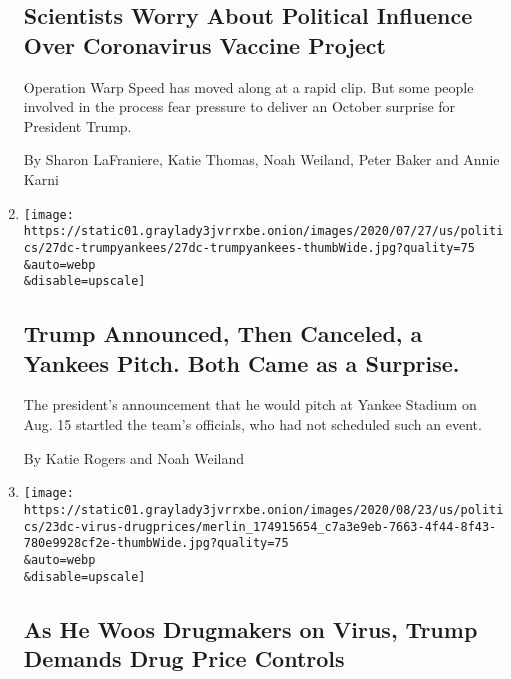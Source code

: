 \begin{enumerate}
  \hypertarget{scientists-worry-about-political-influence-over-coronavirus-vaccine-project}{%
  \subsection{Scientists Worry About Political Influence Over
  Coronavirus Vaccine
  Project}\label{scientists-worry-about-political-influence-over-coronavirus-vaccine-project}}

  Operation Warp Speed has moved along at a rapid clip. But some people
  involved in the process fear pressure to deliver an October surprise
  for President Trump.

  By Sharon LaFraniere, Katie Thomas, Noah Weiland, Peter Baker and
  Annie Karni
\item
  \href{/2020/07/27/us/politics/trump-yankees-fauci.html}{}

  \texttt{[image: https://static01.graylady3jvrrxbe.onion/images/2020/07/27/us/politics/27dc-trumpyankees/27dc-trumpyankees-thumbWide.jpg?quality=75\\\&auto=webp\\\&disable=upscale]}

  \hypertarget{trump-announced-then-canceled-a-yankees-pitch-both-came-as-a-surprise}{%
  \subsection{Trump Announced, Then Canceled, a Yankees Pitch. Both Came
  as a
  Surprise.}\label{trump-announced-then-canceled-a-yankees-pitch-both-came-as-a-surprise}}

  The president's announcement that he would pitch at Yankee Stadium on
  Aug. 15 startled the team's officials, who had not scheduled such an
  event.

  By Katie Rogers and Noah Weiland
\item
  \href{/2020/07/24/us/politics/trump-drug-prices-coronavirus.html}{}

  \texttt{[image: https://static01.graylady3jvrrxbe.onion/images/2020/08/23/us/politics/23dc-virus-drugprices/merlin\_174915654\_c7a3e9eb-7663-4f44-8f43-780e9928cf2e-thumbWide.jpg?quality=75\\\&auto=webp\\\&disable=upscale]}

  \hypertarget{as-he-woos-drugmakers-on-virus-trump-demands-drug-price-controls}{%
  \subsection{As He Woos Drugmakers on Virus, Trump Demands Drug Price
  Controls}\label{as-he-woos-drugmakers-on-virus-trump-demands-drug-price-controls}}


\end{enumerate}

